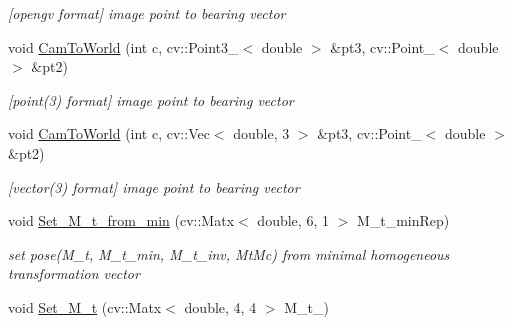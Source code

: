 \begin{DoxyCompactItemize}
\begin{DoxyCompactList}\small\item\em \mbox{[}opengv format\mbox{]} image point to bearing vector \end{DoxyCompactList}\item 
void \hyperlink{classMultiColSLAM_1_1cMultiCamSys___a6d1acde556e1a3e1a439103ccffa7431}{Cam\+To\+World} (int c, cv\+::\+Point3\+\_\+$<$ double $>$ \&pt3, cv\+::\+Point\+\_\+$<$ double $>$ \&pt2)\hypertarget{classMultiColSLAM_1_1cMultiCamSys___a6d1acde556e1a3e1a439103ccffa7431}{}\label{classMultiColSLAM_1_1cMultiCamSys___a6d1acde556e1a3e1a439103ccffa7431}

\begin{DoxyCompactList}\small\item\em \mbox{[}point(3) format\mbox{]} image point to bearing vector \end{DoxyCompactList}\item 
void \hyperlink{classMultiColSLAM_1_1cMultiCamSys___af1406b95527481a1527016e6ae7b31aa}{Cam\+To\+World} (int c, cv\+::\+Vec$<$ double, 3 $>$ \&pt3, cv\+::\+Point\+\_\+$<$ double $>$ \&pt2)\hypertarget{classMultiColSLAM_1_1cMultiCamSys___af1406b95527481a1527016e6ae7b31aa}{}\label{classMultiColSLAM_1_1cMultiCamSys___af1406b95527481a1527016e6ae7b31aa}

\begin{DoxyCompactList}\small\item\em \mbox{[}vector(3) format\mbox{]} image point to bearing vector \end{DoxyCompactList}\item 
void \hyperlink{classMultiColSLAM_1_1cMultiCamSys___a8778a4538527a291be32dbb542d31a10}{Set\+\_\+\+M\+\_\+t\+\_\+from\+\_\+min} (cv\+::\+Matx$<$ double, 6, 1 $>$ M\+\_\+t\+\_\+min\+Rep)\hypertarget{classMultiColSLAM_1_1cMultiCamSys___a8778a4538527a291be32dbb542d31a10}{}\label{classMultiColSLAM_1_1cMultiCamSys___a8778a4538527a291be32dbb542d31a10}

\begin{DoxyCompactList}\small\item\em set pose(\+M\+\_\+t, M\+\_\+t\+\_\+min, M\+\_\+t\+\_\+inv, Mt\+Mc) from minimal homogeneous transformation vector \end{DoxyCompactList}\item 
void \hyperlink{classMultiColSLAM_1_1cMultiCamSys___a5f55a4c3d92dda52ecaf3517df5daa12}{Set\+\_\+\+M\+\_\+t} (cv\+::\+Matx$<$ double, 4, 4 $>$ M\+\_\+t\+\_\+)\hypertarget{classMultiColSLAM_1_1cMultiCamSys___a5f55a4c3d92dda52ecaf3517df5daa12}{}\label{classMultiColSLAM_1_1cMultiCamSys___a5f55a4c3d92dda52ecaf3517df5daa12}


\end{DoxyCompactItemize}
